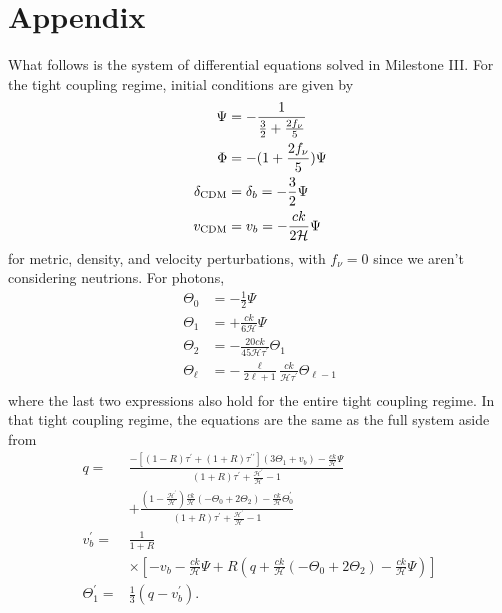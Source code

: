 \documentclass[aps,prl,twocolumn,groupedaddress,nofootinbib]{revtex4-2}
\begin{document}
\section{Appendix}
What follows is the system of differential equations solved in Milestone III. For the tight coupling regime, initial conditions are given by
\begin{align*}
    \Psi             & = -\frac{1}{\frac{3}{2} + \frac{2f_\nu}{5}} \\
    \Phi             & = -(1+\frac{2f_\nu}{5})\Psi                 \\
    \delta_{\rm CDM} & = \delta_b = -\frac{3}{2} \Psi              \\
    v_{\rm CDM}      & = v_b = -\frac{ck}{2\mathcal{H}} \Psi       \\
\end{align*}
for metric, density, and velocity perturbations, with $f_\nu=0$ since we aren't considering neutrions. For photons,
\begin{align*}
    \Theta_0    & = -\frac{1}{2} \Psi                                                       \\
    \Theta_1    & = +\frac{ck}{6\mathcal{H}}\Psi                                            \\
    \Theta_2    & = -\frac{20ck}{45\mathcal{H}\tau^\prime} \Theta_1                         \\
    \Theta_\ell & = -\frac{\ell}{2\ell+1} \frac{ck}{\mathcal{H}\tau^\prime} \Theta_{\ell-1} \\
\end{align*}
where the last two expressions also hold for the entire tight coupling regime. In that tight coupling regime, the equations are the same as the full system aside from
\begin{align*}
    q=
     & \frac{-[(1-R)\tau^\prime + (1+R)\tau^{\prime\prime}](3\Theta_1+v_b) -\frac{ck}{\mathcal{H}}\Psi}{(1+R)\tau^\prime + \frac{\mathcal{H}^\prime}{\mathcal{H}} -1}                                        \\
     & + \frac{(1-\frac{\mathcal{H}^\prime}{\mathcal{H}})\frac{ck}{\mathcal{H}}(-\Theta_0 +2\Theta_2) - \frac{ck}{\mathcal{H}}\Theta_0^\prime}{(1+R)\tau^\prime + \frac{\mathcal{H}^\prime}{\mathcal{H}} -1} \\
    v_b^\prime=
     & \frac{1}{1+R}                                                                                                                                                                                         \\
     & \times\left[-v_b - \frac{ck}{\mathcal{H}}\Psi + R(q +\frac{ck}{\mathcal{H}}(-\Theta_0 + 2\Theta_2) - \frac{ck}{\mathcal{H}}\Psi)\right]                                                               \\
    \Theta^\prime_1=
     & \frac{1}{3} (q - v_b^\prime).
\end{align*}
\end{document}

